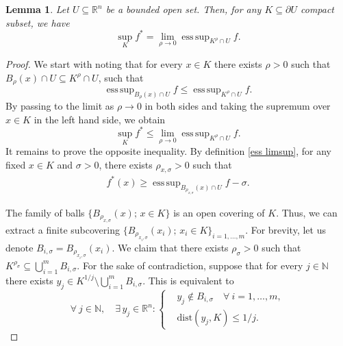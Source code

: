 \documentclass[a4paper,11pt]{article}
\numberwithin{equation}{section}
\newtheorem{Lemma}[Theorem]{Lemma}
\newcommand{\numberset}{\mathbb}
\newcommand{\N}{\numberset{N}}
\newcommand{\R}{\numberset{R}}
\DeclareMathOperator*{\esssup}{ess\,sup}
\theoremstyle{definition}
\begin{document}
\begin{Lemma}\label{lemma esssup}
Let $U\subseteq\R^n$ be a bounded open set. Then, for any $K\subseteq\partial U$ compact subset, we have
$$
\sup_K f^*=\lim_{\rho\to  0} \esssup_{K^\rho\cap U}f.
$$
\end{Lemma}
\begin{proof}
We start with noting that for every $x\in K$ there exists $\rho>0$ such that $B_\rho(x)\cap U\subseteq K^\rho\cap U$, such that
$$
\esssup_{B_\rho(x)\cap U}f\leq \esssup_{K^\rho\cap U}f.
$$
By passing to the limit as $\rho\to  0$ in both sides and taking the supremum over $x\in K$ in the left hand side, we obtain
$$
\sup_K f^*\leq\lim_{\rho\to  0} \esssup_{K^\rho\cap U}f.
$$
It remains to prove the opposite inequality. By definition \ref{ess limsup}, for any fixed $x\in K$ and $\sigma>0$, there exists $\rho_{x,\sigma}>0$ such that 
\begin{align}\label{def of lim}
f^*(x)\geq\esssup_{B_{\rho_{x,\sigma}}(x)\cap U}f-\sigma.
\end{align}

The family of balls $\{B_{\rho_{x,\sigma}}(x); \,x\in K\}$ is an open covering of $K$. Thus, we can extract a finite subcovering $\{B_{\rho_{x_i,\sigma}}(x_i); \,x_i\in K\} _{i=1,\ldots,m}$.
For brevity, let us denote $B_{i,\sigma}=B_{\rho_{x_i,\sigma}}(x_i)$. We claim that there exists $\rho_\sigma>0$ such that $K^{\rho_\sigma}\subseteq \bigcup_{i=1}^m B_{i,\sigma}$. For the sake of contradiction, suppose that for every $j\in\N$ there exists $y_j\in K^{1/j}\setminus\bigcup_{i=1}^m B_{i,\sigma}$. This is equivalent to  
\begin{equation}\label{contr}
\forall\  j\in\N, \quad\exists\, y_j\in\R^n:\left\{
\begin{aligned}
 &y_j\notin B_{i,\sigma}\quad\forall\  i=1,\ldots,m,\\
&\mathrm{dist}(y_j,K)\leq 1/j.
\end{aligned}
\right.
\end{equation}

\end{proof}
\end{document}

